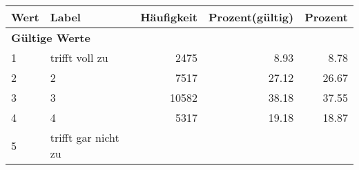      \begin{longtable}{lXrrr}
     \toprule
     \textbf{Wert} & \textbf{Label} & \textbf{Häufigkeit} & \textbf{Prozent(gültig)} & \textbf{Prozent} \\
     \endhead
     \midrule
     \multicolumn{5}{l}{\textbf{Gültige Werte}}\\

     1 &
     \multicolumn{1}{X}{ trifft voll zu   } &


       \num{2475} &
       \num[round-mode=places,round-precision=2]{8,93} &
         \num[round-mode=places,round-precision=2]{8,78} \\

     2 &
     \multicolumn{1}{X}{ 2   } &


       \num{7517} &
       \num[round-mode=places,round-precision=2]{27,12} &
         \num[round-mode=places,round-precision=2]{26,67} \\

     3 &
     \multicolumn{1}{X}{ 3   } &


       \num{10582} &
       \num[round-mode=places,round-precision=2]{38,18} &
         \num[round-mode=places,round-precision=2]{37,55} \\

     4 &
     \multicolumn{1}{X}{ 4   } &


       \num{5317} &
       \num[round-mode=places,round-precision=2]{19,18} &
         \num[round-mode=places,round-precision=2]{18,87} \\

     5 &
     \multicolumn{1}{X}{ trifft gar nicht zu   } &



\end{longtable}
